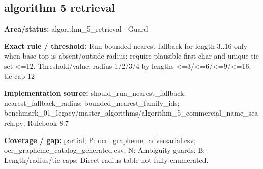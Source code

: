 \subsection*{algorithm 5 retrieval}
\begin{tcolorbox}[enhanced,breakable,colback=white,colframe=Muted!45,boxrule=0.45pt,arc=1.5pt,left=6pt,right=6pt,top=5pt,bottom=5pt,title={\texttt{A5-NEAREST-FALLBACK-08}},title after break={\texttt{A5-NEAREST-FALLBACK-08}\ (continued)},fonttitle=\headingfont\bfseries\color{Navy},coltitle=Navy]
\textbf{Area/status:} algorithm\_\allowbreak{}5\_\allowbreak{}retrieval $\boldsymbol{\cdot}$ Guard\par
\smallskip
\textbf{Exact rule / threshold:} Run bounded nearest fallback for length 3..16 only when base top is absent/\allowbreak{}outside radius; require plausible first char and unique tie set <=12. Threshold/\allowbreak{}value: radius 1/\allowbreak{}2/\allowbreak{}3/\allowbreak{}4 by lengths <=3/\allowbreak{}<=6/\allowbreak{}<=9/\allowbreak{}<=16; tie cap 12\par
\smallskip
\textbf{Implementation source:} should\_\allowbreak{}run\_\allowbreak{}nearest\_\allowbreak{}fallback; nearest\_\allowbreak{}fallback\_\allowbreak{}radius; bounded\_\allowbreak{}nearest\_\allowbreak{}family\_\allowbreak{}ids; benchmark\_\allowbreak{}01\_\allowbreak{}legacy/\allowbreak{}master\_\allowbreak{}algorithms/\allowbreak{}algorithm\_\allowbreak{}5\_\allowbreak{}commercial\_\allowbreak{}name\_\allowbreak{}search.py; Rulebook 8.7\par
\smallskip
\textbf{Coverage / gap:} partial; P: ocr\_\allowbreak{}grapheme\_\allowbreak{}adversarial.csv; ocr\_\allowbreak{}grapheme\_\allowbreak{}catalog\_\allowbreak{}generated.csv; N: Ambiguity guards; B: Length/\allowbreak{}radius/\allowbreak{}tie caps; Direct radius table not fully enumerated.
\end{tcolorbox}
\medskip
